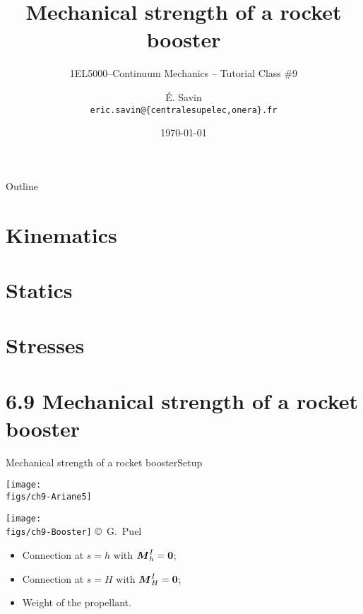 \documentclass{beamer}
\title[1EL5000/S9]
{Mechanical strength of a rocket booster}
\subtitle{1EL5000--Continuum Mechanics -- Tutorial Class \#9} %
\author[\'E. Savin] %
{\'E. Savin\inst{1,2}\\ \scriptsize{\texttt{eric.savin@\{centralesupelec,onera\}.fr}}}%
\institute[Onera] %
{\inst{1}{Information Processing and Systems Dept.\\\Onera, France}
\and
 \inst{2}{Mechanical and Civil Engineering Dept.\\\ECP, France}}%
\date{\today}
\newcommand{\Mresj}{M}
\newcommand{\Mres}{{\boldsymbol\Mresj}}
\newcommand{\bzero}{{\bf 0}}
\begin{document}
\begin{frame}
  \titlepage
\end{frame}

\begin{frame}{Outline}
  \tableofcontents
\end{frame}




\section{Kinematics}


\section{Statics}


\section{Stresses}


\section{6.9 Mechanical strength of a rocket booster}

\begin{frame}{Mechanical strength of a rocket booster}{Setup}

\begin{overprint}

\centering\texttt{[image: \\figs/ch9-Ariane5]}

\centering\texttt{[image: \\figs/ch9-Booster]}
\vskip-8pt{\hspace{6truecm}\mbox{\tiny{\copyright\ G. Puel}}}

\begin{itemize}
\item Connection at $s=h$ with $\Mres_h^I=\bzero$; 
\item Connection at $s=H$ with $\Mres_H^I=\bzero$;
\item Weight of the propellant.
\end{itemize}

\end{overprint}

\end{frame}
\end{document}

